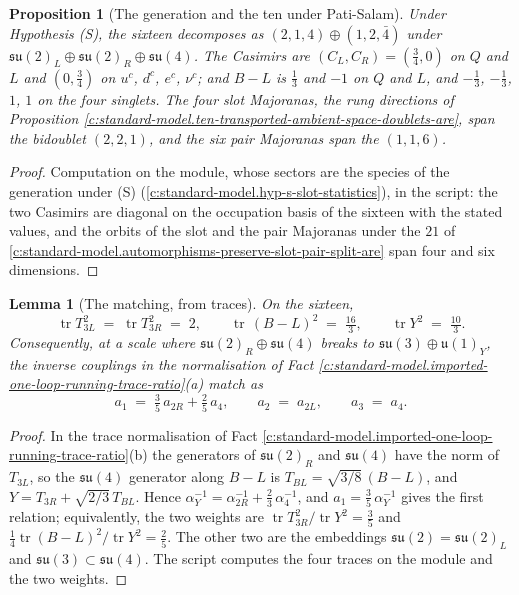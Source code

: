\documentclass[11pt]{article}
\newtheorem{proposition}[theorem]{Proposition}
\newtheorem{lemma}[theorem]{Lemma}
\theoremstyle{definition}
\theoremstyle{plain}
\newcommand{\changedmark}[2]{\marginpar{\raggedright\scriptsize\color{#1}#2}}
\providecommand{\su}{}\renewcommand{\su}{\mathfrak{su}}
\providecommand{\tr}{}\renewcommand{\tr}{\operatorname{tr}}
\providecommand{\uu}{}\renewcommand{\uu}{\mathfrak{u}}
\begin{document}
\begin{proposition}[The generation and the ten under Pati-Salam]\label{c:standard-model.generation-ten-under-pati-salam}
\changedmark{gray}{reworded}
Under Hypothesis (S), the sixteen decomposes as $(2,1,4) \oplus (1,2,\bar{4})$ under $\su(2)_{L} \oplus \su(2)_{R} \oplus \su(4)$. The Casimirs are $(C_{L}, C_{R}) = (\tfrac34, 0)$ on $Q$ and $L$ and $(0, \tfrac34)$ on $u^{c}$, $d^{c}$, $e^{c}$, $\nu^{c}$; and $B - L$ is $\tfrac13$ and $-1$ on $Q$ and $L$, and $-\tfrac13$, $-\tfrac13$, $1$, $1$ on the four singlets. The four slot Majoranas, the rung directions of Proposition \ref{c:standard-model.ten-transported-ambient-space-doublets-are}, span the bidoublet $(2,2,1)$, and the six pair Majoranas span the $(1,1,6)$.
\end{proposition}
\begin{proof}
Computation on the module, whose sectors are the species of the generation under (S) (\ref{c:standard-model.hyp-s-slot-statistics}), in the script: the two Casimirs are diagonal on the occupation basis of the sixteen with the stated values, and the orbits of the slot and the pair Majoranas under the $21$ of \ref{c:standard-model.automorphisms-preserve-slot-pair-split-are} span four and six dimensions.

\end{proof}

\begin{lemma}[The matching, from traces]\label{c:standard-model.matching-traces}
On the sixteen,
\[
\tr T_{3L}^{2} \;=\; \tr T_{3R}^{2} \;=\; 2, \qquad \tr\,(B - L)^{2} \;=\; \tfrac{16}{3}, \qquad \tr Y^{2} \;=\; \tfrac{10}{3}.
\]
Consequently, at a scale where $\su(2)_{R} \oplus \su(4)$ breaks to $\su(3) \oplus \uu(1)_{Y}$, the inverse couplings in the normalisation of Fact \ref{c:standard-model.imported-one-loop-running-trace-ratio}(a) match as
\[
a_{1} \;=\; \tfrac35\, a_{2R} + \tfrac25\, a_{4}, \qquad a_{2} \;=\; a_{2L}, \qquad a_{3} \;=\; a_{4}.
\]
\end{lemma}
\begin{proof}
In the trace normalisation of Fact \ref{c:standard-model.imported-one-loop-running-trace-ratio}(b) the generators of $\su(2)_{R}$ and $\su(4)$ have the norm of $T_{3L}$, so the $\su(4)$ generator along $B - L$ is $T_{BL} = \sqrt{3/8}\,(B - L)$, and $Y = T_{3R} + \sqrt{2/3}\,T_{BL}$. Hence $\alpha_{Y}^{-1} = \alpha_{2R}^{-1} + \tfrac23\,\alpha_{4}^{-1}$, and $a_{1} = \tfrac35\,\alpha_{Y}^{-1}$ gives the first relation; equivalently, the two weights are $\tr T_{3R}^{2}/\tr Y^{2} = \tfrac35$ and $\tfrac14\tr(B - L)^{2}/\tr Y^{2} = \tfrac25$. The other two are the embeddings $\su(2) = \su(2)_{L}$ and $\su(3) \subset \su(4)$. The script computes the four traces on the module and the two weights.

\end{proof}
\end{document}
